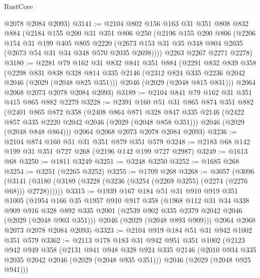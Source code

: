 \begin{lexlean}{RustCore}
\begin{coremodule}
      @2078
      @2084
      @2093)
@3141 := @2104
    @802
    @156
    @163
    @31
    @351
    @808
    @832
    @884
    (@2184
      @155
      @200
      @31
      @351
      @806
      @250
      (@2196
        @155
        @200
        @806
        (@2206
          @154
          @31
          @199
          @405
          @805
          @2220
          (@2673 @153 @31 @35 @348 @804 @2035 (@2673 @54 @31 @34 @348 @570 @2035 @2698))))
      @2263
      @2267
      @2271
      @2278)
@3180 := @2281
    @79
    @162
    @31
    @832
    @841
    @351
    @884
    (@2291
      @832
      @839
      @358
      (@2298
        @831
        @838
        @328
        @814
        @335
        @2146
        (@2312 @824 @335 @2236 @2042 @2046 (@2029 (@2048 @825 @351)))
        @2046
        (@2029 (@2048 @815 @831)))
      @2064
      @2068
      @2073
      @2078
      @2084
      @2093)
@3189 := @2104 @841 @79 @162 @31 @351 @415 @865 @882 @2279
@3228 := @2391
    @160
    @51
    @31
    @865
    @874
    @351
    @882
    (@2401
      @865
      @872
      @358
      (@2408
        @864
        @871
        @328
        @847
        @335
        @2146
        (@2422 @857 @335 @2220 @2042 @2046 (@2029 (@2048 @858 @351)))
        @2046
        (@2029 (@2048 @848 @864)))
      @2064
      @2068
      @2073
      @2078
      @2084
      @2093)
@3236 := @2104 @874 @160 @51 @31 @351 @879 @351 @579
@3248 := @2183 @68 @142 @199 @31 @351 @727 @268 (@2196 @142 @199 @727 @2987)
@3249 := @1613 @68
@3250 := @1811 @3249
@3251 := @3248 @3250
@3252 := @1685 @268
@3254 := @3251 (@2265 @3252)
@3255 := @1709 @268
@3268 := @3057
    (@3096 (@3141 (@3180 (@3189 (@3228 (@3236 (@3254 (@2269 @3255) (@2274 (@2276 @68))) @2728))))))
@3315 := @1939
    @167
    @184
    @51
    @31
    @910
    @919
    @351
    @1005
    (@1954
      @166
      @35
      @1957
      @910
      @917
      @358
      (@1968
        @112
        @31
        @34
        @338
        @909
        @916
        @328
        @892
        @335
        @2001
        (@2539 @902 @335 @2379 @2042 @2046 (@2029 (@2048 @903 @351)))
        @2046
        (@2029 (@2048 @893 @909)))
      @2064
      @2068
      @2073
      @2078
      @2084
      @2093)
@3323 := @2104 @919 @184 @51 @31 @942 @1002 @351 @579
@3362 := @2113
    @178
    @183
    @31
    @942
    @951
    @351
    @1002
    (@2123
      @942
      @949
      @358
      (@2131
        @941
        @948
        @328
        @924
        @335
        @2146
        (@2010 @934 @335 @2035 @2042 @2046 (@2029 (@2048 @935 @351)))
        @2046
        (@2029 (@2048 @925 @941)))

\end{coremodule}
\end{lexlean}

